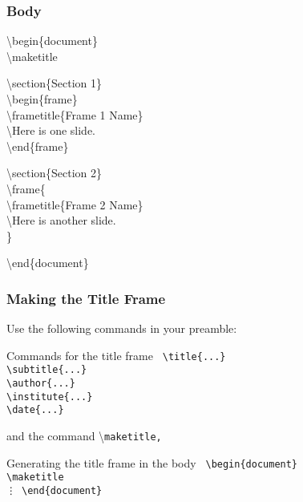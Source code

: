 \documentclass[article]{beamer}
\begin{document}
\begin{frame}
\frametitle{Body}

\scriptsize{\tt{
\alert{\textbackslash begin\{document\}} \\ \vspace{0.2cm}
\textbackslash maketitle\\ \vspace{0.2cm}

\textbackslash section\{Section 1\}\\
\textbackslash begin\{frame\}\\
\textbackslash frametitle\{Frame 1 Name\}\\
\textbackslash Here is one slide.\\
\textbackslash end\{frame\}\\ \vspace{0.2cm}

\textbackslash section\{Section 2\}\\
\textbackslash frame\{\\
\textbackslash frametitle\{Frame 2 Name\}\\
\textbackslash Here is another slide.\\
\}\\ \vspace{0.2cm}

\alert{\textbackslash end\{document\}}\\
}}
\end{frame}




\begin{frame}
\frametitle{Making the Title Frame}

Use the following commands in your preamble:
\begin{block}{Commands for the title frame}
\scriptsize{\tt{
\textbackslash title\{...\} \\
\textbackslash subtitle\{...\} \\
\textbackslash author\{...\}\\
\textbackslash institute\{...\}\\
\textbackslash date\{...\} \\
}}
\end{block}
and the command \textbackslash \tt{maketitle}, 
\begin{block}{Generating the title frame in the body}
\scriptsize{\tt{
\textbackslash begin\{document\} \\ 
\textbackslash maketitle\\ 
\vdots
\textbackslash end\{document\}\\
}}
\end{block}
\end{frame}
\end{document}
